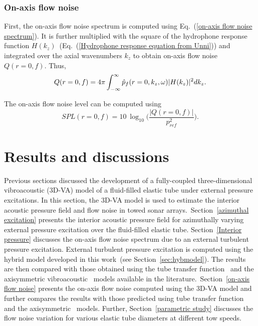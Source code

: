 \documentclass[11pt,cleanfoot]{asme2ej}
\begin{document}
\subsubsection{On-axis flow noise}
First, the on-axis flow noise spectrum is computed using Eq.~(\ref{on-axis flow noise spectrum}). It is further multiplied with the square of the hydrophone response function $H(k_z)$~(Eq.~(\ref{Hydrophone response equation from Unni})) and integrated over the axial wavenumbers $k_z$ to obtain on-axis flow noise $Q(r=0,f)$. Thus,
\begin{equation}\label{on axis flow noise equation}
    Q(r=0,f) =  4\pi\int_{-\infty}^{\infty} \Hat{p}_f(r=0,k_z,\omega)|H(k_z)|^2dk_z.
\end{equation}

The on-axis flow noise level can be computed using
\begin{equation}\label{spl on-axis flow noise}
    SPL(r=0,f) = 10~\log_{10}\bigg(\frac{|Q(r=0,f)|}{p_{ref}^2}\bigg).
\end{equation}



\section{Results and discussions}\label{sec:results}
Previous sections discussed the development of a fully-coupled three-dimensional vibroacoustic (3D-VA) model of a fluid-filled elastic tube under external pressure excitations. In this section, the 3D-VA model is used to estimate the interior acoustic pressure field and flow noise in towed sonar arrays.~Section~\ref{azimuthal excitation} presents the interior acoustic pressure field for azimuthally varying external pressure excitation over the fluid-filled elastic tube. Section~\ref{Interior pressure} discusses the on-axis flow noise spectrum due to an external turbulent pressure excitation. External turbulent pressure excitation is computed using the hybrid model developed in this work~(see Section~\ref{sec:hybmodel}). The results are then compared with those obtained using the tube transfer function~\cite{knight1996} and the axisymmetric vibroacoustic~\cite{jineesh2013,Rakesh2024} models available in the literature.~Section~\ref{on-axis flow noise} presents the on-axis flow noise computed using the 3D-VA model and further compares the results with those predicted using tube transfer function~\cite{knight1996} and the axisymmetric~\cite{jineesh2013} models. Further, Section~\ref{parametric study} discusses the flow noise variation for various elastic tube diameters at different tow speeds.
\end{document}
